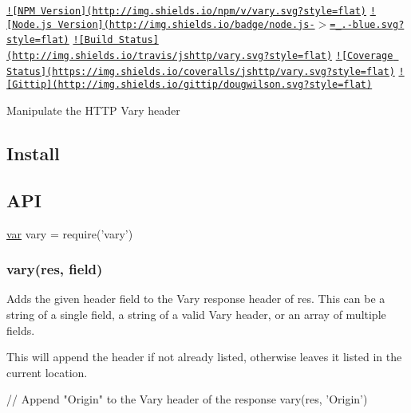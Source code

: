 \href{https://www.npmjs.org/package/vary}{\tt !\mbox{[}N\+P\+M Version\mbox{]}(http\+://img.\+shields.\+io/npm/v/vary.\+svg?style=flat)} \href{http://nodejs.org/download/}{\tt !\mbox{[}Node.\+js Version\mbox{]}(http\+://img.\+shields.\+io/badge/node.\+js-\/$>$=\+\_.-\/blue.\+svg?style=flat)} \href{https://travis-ci.org/jshttp/vary}{\tt !\mbox{[}Build Status\mbox{]}(http\+://img.\+shields.\+io/travis/jshttp/vary.\+svg?style=flat)} \href{https://coveralls.io/r/jshttp/vary}{\tt !\mbox{[}Coverage Status\mbox{]}(https\+://img.\+shields.\+io/coveralls/jshttp/vary.\+svg?style=flat)} \href{https://www.gittip.com/dougwilson/}{\tt !\mbox{[}Gittip\mbox{]}(http\+://img.\+shields.\+io/gittip/dougwilson.\+svg?style=flat)}

Manipulate the H\+T\+T\+P Vary header

\subsection*{Install}




\subsection*{A\+P\+I}


\begin{DoxyCode}
\hyperlink{018__def_8c_a335628f2e9085305224b4f9cc6e95ed5}{var} vary = require(\textcolor{stringliteral}{'vary'})
\end{DoxyCode}


\subsubsection*{vary(res, field)}

Adds the given header {\ttfamily field} to the {\ttfamily Vary} response header of {\ttfamily res}. This can be a string of a single field, a string of a valid {\ttfamily Vary} header, or an array of multiple fields.

This will append the header if not already listed, otherwise leaves it listed in the current location.


\begin{DoxyCode}
\textcolor{comment}{// Append "Origin" to the Vary header of the response}
vary(res, \textcolor{stringliteral}{'Origin'})
\end{DoxyCode}


